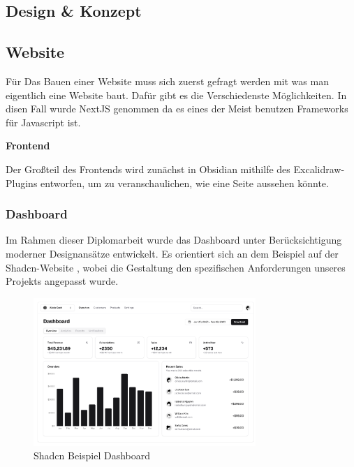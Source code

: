 \begin{inhalt}
\chapter{Design \& Konzept}
\renewcommand*\chapterpagestyle{scrheadings}

\section{Website}

Für Das Bauen einer Website muss sich zuerst gefragt werden mit was man eigentlich eine Website baut. Dafür gibt es die Verschiedenste Möglichkeiten. In disen Fall wurde NextJS genommen da es eines der Meist benutzen Frameworks \cite{SurveyStackOverflow} für Javascript ist.

\vspace{1cm}

\textbf{Frontend}

Der Großteil des Frontends wird zunächst in Obsidian mithilfe des Excalidraw-Plugins entworfen, um zu veranschaulichen, wie eine Seite aussehen könnte.

\newpage
\subsection{Dashboard}

Im Rahmen dieser Diplomarbeit wurde das Dashboard unter Berücksichtigung moderner Designansätze entwickelt. Es orientiert sich an dem Beispiel auf der Shadcn-Website \cite{ShadCNDashboard}, wobei die Gestaltung den spezifischen Anforderungen unseres Projekts angepasst wurde.

\begin{figure}[!htb] 
\centering 
\includegraphics[width=0.75\textwidth]{files/Thomas/pics/Design-Grundlagen/Frontend/Dashboard/dashboard.png} 
\caption[Bildbezeichnung für Abbildungsverzeichnis]{Shadcn Beispiel Dashboard} 
\label{fig:gehaeuse_internet_bild} 
\end{figure}


\end{inhalt}
